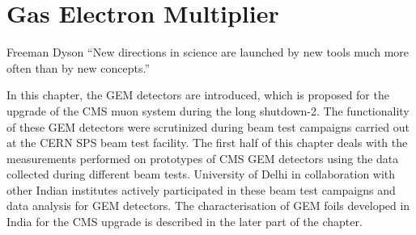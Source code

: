 \chapter{Gas Electron Multiplier} %
\label{cha:gas_electron_multiplier}
\begin{chapquote}
{Freeman Dyson}
``New directions in science are launched by new tools much more often than by new concepts.''
\end{chapquote}

In this chapter, the GEM detectors are introduced, which is proposed for the upgrade of the CMS muon system during the long shutdown-2.
The functionality of these GEM detectors were scrutinized during beam test campaigns carried out at the CERN SPS beam test facility.
The first half of this chapter deals with the measurements performed on prototypes of CMS GEM detectors using the data collected during  different beam tests.
University of Delhi in collaboration with other Indian institutes actively participated in these beam test campaigns and data analysis for GEM detectors.
The characterisation of GEM foils developed in India for the CMS upgrade is described in the later part of the chapter.

